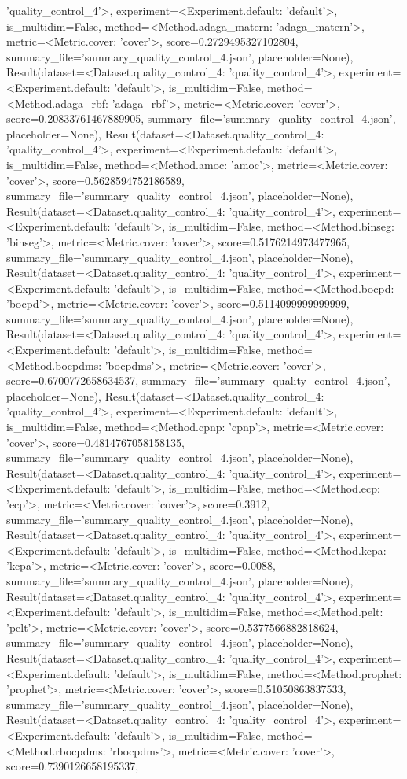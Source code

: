 'quality_control_4'>, experiment=<Experiment.default: 'default'>, is_multidim=False, method=<Method.adaga_matern: 'adaga_matern'>, metric=<Metric.cover: 'cover'>, score=0.2729495327102804, summary_file='summary_quality_control_4.json', placeholder=None), Result(dataset=<Dataset.quality_control_4: 'quality_control_4'>, experiment=<Experiment.default: 'default'>, is_multidim=False, method=<Method.adaga_rbf: 'adaga_rbf'>, metric=<Metric.cover: 'cover'>, score=0.20833761467889905, summary_file='summary_quality_control_4.json', placeholder=None), Result(dataset=<Dataset.quality_control_4: 'quality_control_4'>, experiment=<Experiment.default: 'default'>, is_multidim=False, method=<Method.amoc: 'amoc'>, metric=<Metric.cover: 'cover'>, score=0.5628594752186589, summary_file='summary_quality_control_4.json', placeholder=None), Result(dataset=<Dataset.quality_control_4: 'quality_control_4'>, experiment=<Experiment.default: 'default'>, is_multidim=False, method=<Method.binseg: 'binseg'>, metric=<Metric.cover: 'cover'>, score=0.5176214973477965, summary_file='summary_quality_control_4.json', placeholder=None), Result(dataset=<Dataset.quality_control_4: 'quality_control_4'>, experiment=<Experiment.default: 'default'>, is_multidim=False, method=<Method.bocpd: 'bocpd'>, metric=<Metric.cover: 'cover'>, score=0.5114099999999999, summary_file='summary_quality_control_4.json', placeholder=None), Result(dataset=<Dataset.quality_control_4: 'quality_control_4'>, experiment=<Experiment.default: 'default'>, is_multidim=False, method=<Method.bocpdms: 'bocpdms'>, metric=<Metric.cover: 'cover'>, score=0.6700772658634537, summary_file='summary_quality_control_4.json', placeholder=None), Result(dataset=<Dataset.quality_control_4: 'quality_control_4'>, experiment=<Experiment.default: 'default'>, is_multidim=False, method=<Method.cpnp: 'cpnp'>, metric=<Metric.cover: 'cover'>, score=0.4814767058158135, summary_file='summary_quality_control_4.json', placeholder=None), Result(dataset=<Dataset.quality_control_4: 'quality_control_4'>, experiment=<Experiment.default: 'default'>, is_multidim=False, method=<Method.ecp: 'ecp'>, metric=<Metric.cover: 'cover'>, score=0.3912, summary_file='summary_quality_control_4.json', placeholder=None), Result(dataset=<Dataset.quality_control_4: 'quality_control_4'>, experiment=<Experiment.default: 'default'>, is_multidim=False, method=<Method.kcpa: 'kcpa'>, metric=<Metric.cover: 'cover'>, score=0.0088, summary_file='summary_quality_control_4.json', placeholder=None), Result(dataset=<Dataset.quality_control_4: 'quality_control_4'>, experiment=<Experiment.default: 'default'>, is_multidim=False, method=<Method.pelt: 'pelt'>, metric=<Metric.cover: 'cover'>, score=0.5377566882818624, summary_file='summary_quality_control_4.json', placeholder=None), Result(dataset=<Dataset.quality_control_4: 'quality_control_4'>, experiment=<Experiment.default: 'default'>, is_multidim=False, method=<Method.prophet: 'prophet'>, metric=<Metric.cover: 'cover'>, score=0.51050863837533, summary_file='summary_quality_control_4.json', placeholder=None), Result(dataset=<Dataset.quality_control_4: 'quality_control_4'>, experiment=<Experiment.default: 'default'>, is_multidim=False, method=<Method.rbocpdms: 'rbocpdms'>, metric=<Metric.cover: 'cover'>, score=0.7390126658195337, 